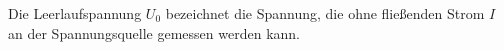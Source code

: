 Die Leerlaufspannung $U_{\text{0}}$ bezeichnet die Spannung, die ohne
fließenden Strom $I$ an der Spannungsquelle gemessen werden kann. 
